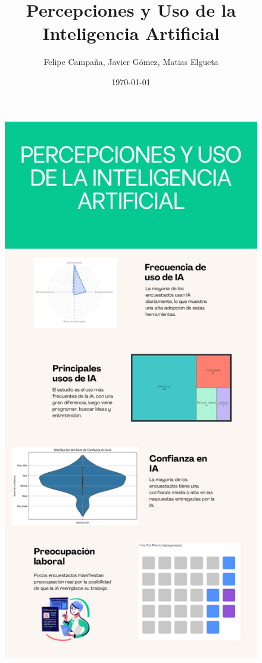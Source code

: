 \documentclass[12pt, a4paper]{article}
\title{Percepciones y Uso de la Inteligencia Artificial}
\author{Felipe Campaña, Javier Gómez, Matias Elgueta}
\date{\today\\[2cm]}
\begin{document}
\maketitle

\vspace*{0.3cm}
\begin{figure}[H]
    \centering
    \begin{minipage}[t]{0.45\linewidth}
        \centering
        \includegraphics[width=\linewidth]{Graficos/1.png}

\end{minipage}
\end{figure}
\end{document}
